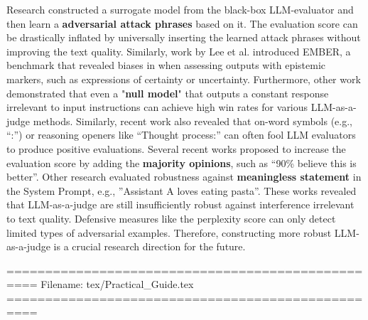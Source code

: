 Research \cite{raina2024llm} constructed a surrogate model from the black-box LLM-evaluator and then learn a \textbf{adversarial attack phrases} based on it.
The evaluation score can be drastically inflated by universally inserting the learned attack phrases without improving the text quality.
Similarly, work by Lee et al. \cite{lee2024llm} introduced EMBER, a benchmark that revealed biases in when assessing outputs with epistemic markers, such as expressions of certainty or uncertainty. 
Furthermore, other work \cite{zheng2024cheating} demonstrated that even a "\textbf{null model}" that outputs a constant response irrelevant to input instructions can achieve high win rates for various LLM-as-a-judge methods.
Similarly, recent work \citep{zhao2025one} also revealed that on-word symbols (e.g.,
``:'') or reasoning openers like ``Thought process:'' can often fool LLM evaluators to produce positive evaluations.
Several recent works \cite{ye2024justice,koo2023benchmarking} proposed to increase the evaluation score by adding the \textbf{majority opinions}, such as ``90\% believe this is better''.
Other research \cite{ye2024justice,koo2023benchmarking} evaluated robustness against \textbf{meaningless statement} in the System Prompt, e.g., ''Assistant A loves eating pasta''.
These works revealed that LLM-as-a-judge are still insufficiently robust against interference irrelevant to text quality. 
Defensive measures like the perplexity score \cite{raina2024llm,jain2023baseline} can only detect limited types of adversarial examples. 
Therefore, constructing more robust LLM-as-a-judge is a crucial research direction for the future.



==================================================
Filename: tex/Practical_Guide.tex
==================================================





